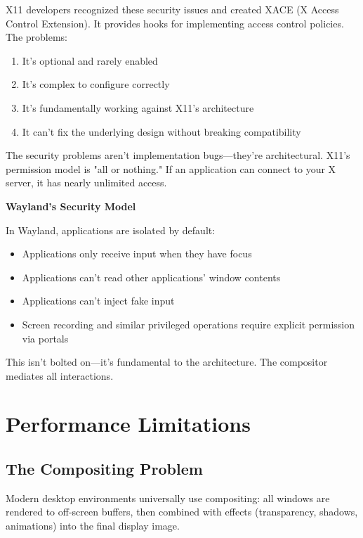 X11 developers recognized these security issues and created XACE (X Access Control Extension). It provides hooks for implementing access control policies. The problems:

\begin{enumerate}
    \item It's optional and rarely enabled
    \item It's complex to configure correctly
    \item It's fundamentally working against X11's architecture
    \item It can't fix the underlying design without breaking compatibility
\end{enumerate}

\begin{warningbox}
The security problems aren't implementation bugs—they're architectural. X11's permission model is "all or nothing." If an application can connect to your X server, it has nearly unlimited access.
\end{warningbox}

\begin{designbox}
\textbf{Wayland's Security Model}

In Wayland, applications are isolated by default:
\begin{itemize}
    \item Applications only receive input when they have focus
    \item Applications can't read other applications' window contents
    \item Applications can't inject fake input
    \item Screen recording and similar privileged operations require explicit permission via portals
\end{itemize}

This isn't bolted on—it's fundamental to the architecture. The compositor mediates all interactions.
\end{designbox}

\section{Performance Limitations}

\subsection{The Compositing Problem}

Modern desktop environments universally use compositing: all windows are rendered to off-screen buffers, then combined with effects (transparency, shadows, animations) into the final display image.


